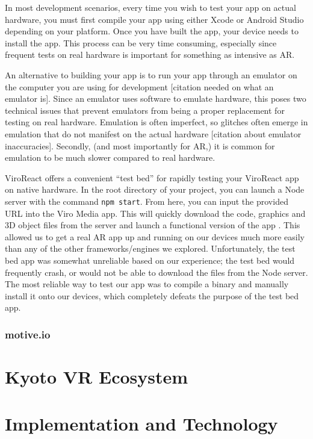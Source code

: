 \documentclass[a4paper, 10pt, american]{article}
\begin{document}
In most development scenarios, every time you wish to test your app on actual
hardware, you must first compile your app using either Xcode or Android Studio
depending on your platform. Once you have built the app, your device needs to
install the app. This process can be very time consuming, especially since
frequent tests on real hardware is important for something as intensive as
AR.

An alternative to building your app is to run your app through an emulator on
the computer you are using for development [citation needed on what an
emulator is]. Since an emulator uses software to emulate hardware, this poses
two technical issues that prevent emulators from being a proper replacement
for testing on real hardware.  Emulation is often imperfect, so glitches often
emerge in emulation that do not manifest on the actual hardware [citation
about emulator inaccuracies]. Secondly, (and most importantly for AR,)
it is common for emulation to be much slower compared to real hardware.

ViroReact offers a convenient ``test bed'' for rapidly testing your ViroReact
app on native hardware. In the root directory of your project, you can launch
a Node server with the command \texttt{npm start}. From here, you can input
the provided URL into the Viro Media app. This will quickly download the code,
graphics and 3D object files from the server and launch a functional version
of the app \autocite{viro-testbed2019}. This allowed us to get a real AR app
up and running on our devices much more easily than any of the other
frameworks/engines we explored. Unfortunately, the test bed app was somewhat
unreliable based on our experience; the test bed would frequently crash,
or would not be able to download the files from the Node server. The most
reliable way to test our app was to compile a binary and manually install it
onto our devices, which completely defeats the purpose of the test bed app.

\subsubsection{motive.io}
\label{sec:motive.io}

\section{Kyoto VR Ecosystem}
\label{sec:KyotoVREcosystem}

\lipsum

\section{Implementation and Technology}
\label{sec:implementationAndTechnology}
\end{document}
